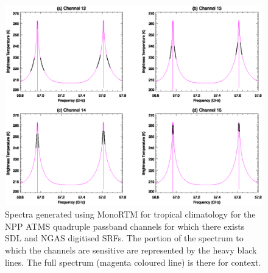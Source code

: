 \begin{figure}[htp]
  \centering
  \includegraphics[scale=1.0]{graphics/spectra/ch12_13_14_15.eps}
  \caption{Spectra generated using MonoRTM for tropical climatology for the NPP ATMS quadruple passband channels for which there exists SDL and NGAS digitised SRFs. The portion of the spectrum  to which the channels are sensitive are represented by the heavy black lines. The full spectrum (magenta coloured line) is there for context.}
  \label{fig:ch12_13_14_15.spectra}
\end{figure}

